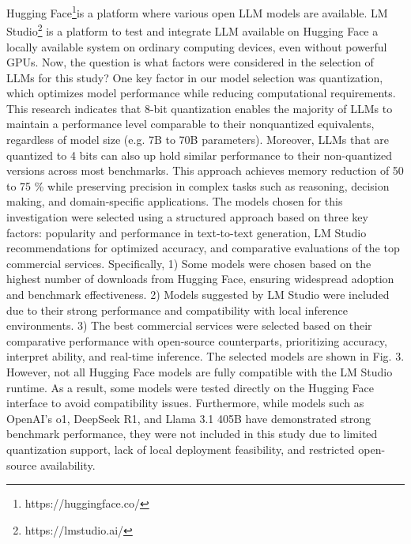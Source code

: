\documentclass[conference]{IEEEtran}
\begin{document}
Hugging Face\footnote{https://huggingface.co/}is a platform where various open LLM models are available. LM Studio\footnote{https://lmstudio.ai/} is a platform to test and integrate LLM available on Hugging Face a locally available system on ordinary computing devices, even without powerful GPUs. Now, the question is what factors were considered in the selection of LLMs for this study? One key factor in our model selection was quantization, which optimizes model performance while reducing computational requirements. This research \cite{Jin2024ACE} indicates that 8-bit quantization enables the majority of LLMs to maintain a performance level comparable to their nonquantized equivalents, regardless of model size (e.g. 7B to 70B parameters). Moreover, LLMs that are quantized to 4 bits can also up hold similar performance to their non-quantized versions across most benchmarks. This approach achieves memory reduction of 50 to 75 \% while preserving precision in complex tasks such as reasoning, decision making, and domain-specific applications. 
The models chosen for this investigation were selected using a structured approach based on three key factors: popularity and performance in text-to-text generation, LM Studio recommendations for optimized accuracy, and comparative evaluations of the top commercial services. Specifically, 1) Some models were chosen based on the highest number of downloads from Hugging Face, ensuring widespread adoption and benchmark effectiveness. 2) Models suggested by LM Studio were included due to their strong performance and compatibility with local inference environments. 3) The best commercial services were selected based on their comparative performance with open-source counterparts, prioritizing accuracy, interpret ability, and real-time inference. The selected models are shown in Fig. 3. However, not all Hugging Face models are fully compatible with the LM Studio runtime. As a result, some models were tested directly on the Hugging Face interface to avoid compatibility issues. Furthermore, while models such as OpenAI’s o1, DeepSeek R1, and Llama 3.1 405B have demonstrated strong benchmark performance, they were not included in this study due to limited quantization support, lack of local deployment feasibility, and restricted open-source availability.
\end{document}
